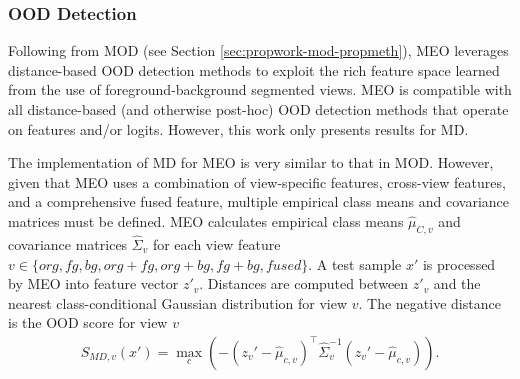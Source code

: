 %
\subsubsection{OOD Detection}
Following from MOD (see Section \ref{sec:propwork-mod-propmeth}), MEO leverages distance-based OOD detection methods to exploit the rich feature space learned from the use of foreground-background segmented views. MEO is compatible with all distance-based (and otherwise post-hoc) OOD detection methods that operate on features and/or logits. However, this work only presents results for MD.

The implementation of MD for MEO is very similar to that in MOD. However, given that MEO uses a combination of view-specific features, cross-view features, and a comprehensive fused feature, multiple empirical class means and covariance matrices must be defined. MEO calculates empirical class means $\hat{\mu}_{C,v}$ and covariance matrices $\hat{\Sigma}_{v}$ for each view feature $v \in \{org, fg, bg, org+fg, org+bg, fg+bg, fused\}$. A test sample $x'$ is processed by MEO into feature vector $z'_{v}$. Distances are computed between $z'_{v}$ and the nearest class-conditional Gaussian distribution for view $v$. The negative distance is the OOD score for view $v$
\begin{equation}
\begin{aligned}
    S_{MD,v}(x') = \max_{c} (-(z_{v}' - \hat{\mu}_{c,v})^\top \hat{\Sigma}_{v}^{-1} (z_{v}' - \hat{\mu}_{c,v})). \\
\end{aligned}
\end{equation}


